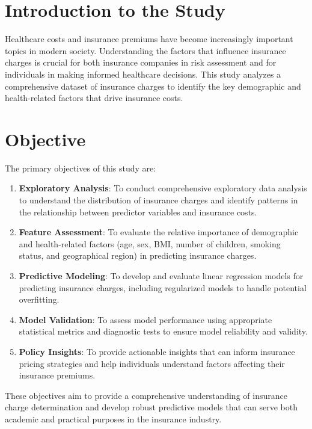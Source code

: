 \documentclass[12pt,a4paper]{article}
\begin{document}
\section{Introduction to the Study}

Healthcare costs and insurance premiums have become increasingly important topics in modern society. Understanding the factors that influence insurance charges is crucial for both insurance companies in risk assessment and for individuals in making informed healthcare decisions. This study analyzes a comprehensive dataset of insurance charges to identify the key demographic and health-related factors that drive insurance costs.

\section{Objective}

The primary objectives of this study are:

\begin{enumerate}
    \item \textbf{Exploratory Analysis}: To conduct comprehensive exploratory data analysis to understand the distribution of insurance charges and identify patterns in the relationship between predictor variables and insurance costs.
    
    \item \textbf{Feature Assessment}: To evaluate the relative importance of demographic and health-related factors (age, sex, BMI, number of children, smoking status, and geographical region) in predicting insurance charges.
    
    \item \textbf{Predictive Modeling}: To develop and evaluate linear regression models for predicting insurance charges, including regularized models to handle potential overfitting.
    
    \item \textbf{Model Validation}: To assess model performance using appropriate statistical metrics and diagnostic tests to ensure model reliability and validity.
    
    \item \textbf{Policy Insights}: To provide actionable insights that can inform insurance pricing strategies and help individuals understand factors affecting their insurance premiums.
\end{enumerate}

These objectives aim to provide a comprehensive understanding of insurance charge determination and develop robust predictive models that can serve both academic and practical purposes in the insurance industry.
\end{document}
